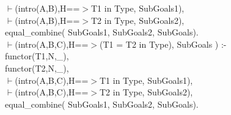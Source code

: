 \documentclass[11pt]{report}
\begin{document}
\begin{description}
\begin{sf}
\begin{tabbing}
\hspace{2em}$\vdash$(intro(A,B),H==$>$T1 in Type, SubGoals1),\\[-0.15ex]
\hspace{2em}$\vdash$(intro(A,B),H==$>$T2 in Type, SubGoals2),\\[-0.15ex]
\hspace{2em}equal\_\hspace{0.1em}combine( SubGoals1, SubGoals2, SubGoals).\\[-0.15ex]
$\vdash$(intro(A,B,C),H==$>$(T1  = T2 in Type), SubGoals ) :-\\[-0.15ex]
\hspace{2em}functor(T1,N,\_\hspace{0.1em}),\\[-0.15ex]
\hspace{2em}functor(T2,N,\_\hspace{0.1em}),\\[-0.15ex]
\hspace{2em}$\vdash$(intro(A,B,C),H==$>$T1 in Type, SubGoals1),\\[-0.15ex]
\hspace{2em}$\vdash$(intro(A,B,C),H==$>$T2 in Type, SubGoals2),\\[-0.15ex]
\hspace{2em}equal\_\hspace{0.1em}combine( SubGoals1, SubGoals2, SubGoals).
\end{tabbing}\end{sf}


\end{description}
\end{document}
